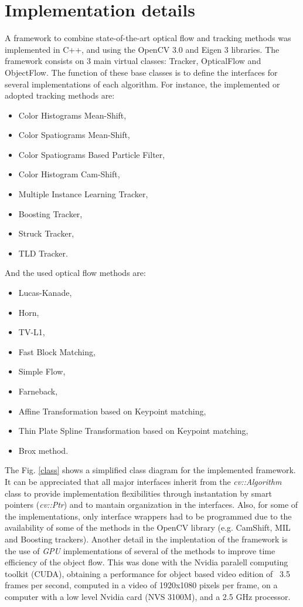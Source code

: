 \section{Implementation details}

A framework to combine state-of-the-art optical flow and tracking methods was implemented in C++, and using the OpenCV 3.0 and Eigen 3 libraries. 
The framework consists on 3 main virtual classes: Tracker, 
OpticalFlow and ObjectFlow. The function of these base classes is to define the interfaces for several implementations of each algorithm. For instance, 
the implemented or adopted tracking methods are:

\begin{itemize}
  \item Color Histograms Mean-Shift,
  \item Color Spatiograms Mean-Shift,
  \item Color Spatiograms Based Particle Filter,
  \item Color Histogram Cam-Shift,
  \item Multiple Instance Learning Tracker,
  \item Boosting Tracker,
  \item Struck Tracker,
  \item TLD Tracker.
\end{itemize}

And the used optical flow methods are:

\begin{itemize}
  \item Lucas-Kanade,
  \item Horn,
  \item TV-L1,
  \item Fast Block Matching, 
  \item Simple Flow,
  \item Farneback,
  \item Affine Transformation based on Keypoint matching,
  \item Thin Plate Spline Transformation based on Keypoint matching,
  \item Brox method.
\end{itemize}

The Fig. \ref{class} shows a simplified class diagram for the implemented framework. It can be appreciated that all major interfaces inherit from the {\it cv::Algorithm} class to provide 
implementation flexibilities through instantation by smart pointers ({\it cv::Ptr}) and to mantain organization in the interfaces. Also, for some of the implementations, only interface wrappers 
had to be programmed due to the availability of some of the methods in the OpenCV library (e.g. CamShift, MIL and Boosting trackers). Another detail in the 
implentation of the framework is the use of {\it GPU} implementations of several of the methods to improve time efficiency of the object flow. This was done with the Nvidia
paralell computing toolkit (CUDA), obtaining a performance for object based video edition of ~3.5 frames per second, computed in a video of 1920x1080 pixels per frame, on a computer with a 
low level Nvidia card (NVS 3100M), and a 2.5 GHz processor.

